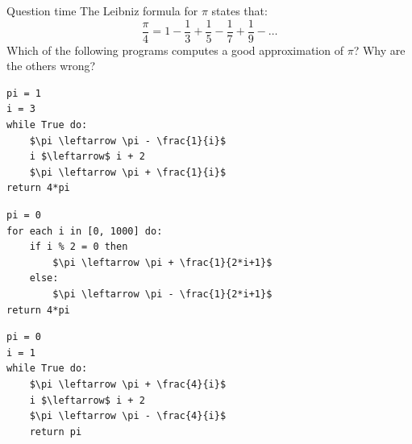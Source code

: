 \documentclass[aspectratio=169,]{beamer}
\begin{document}
\begin{frame}[fragile]{Question time}
    The Leibniz formula for $\pi$ states that:
    \[ \frac{\pi}{4} = 1 - \frac{1}{3} + \frac{1}{5} - \frac{1}{7} + \frac{1}{9} - \ldots \]
    Which of the following programs computes a good approximation of $\pi$?
    Why are the others wrong?

    \begin{minipage}{0.25\textwidth}
        \begin{lstlisting}[style=pseudo]
pi = 1
i = 3
while True do:
    $\pi \leftarrow \pi - \frac{1}{i}$
    i $\leftarrow$ i + 2
    $\pi \leftarrow \pi + \frac{1}{i}$
return 4*pi
        \end{lstlisting}
    \end{minipage}
    \begin{minipage}{0.4\textwidth}
        \begin{lstlisting}[style=pseudo]
pi = 0
for each i in [0, 1000] do:
    if i % 2 = 0 then
        $\pi \leftarrow \pi + \frac{1}{2*i+1}$
    else:
        $\pi \leftarrow \pi - \frac{1}{2*i+1}$
return 4*pi
        \end{lstlisting}
    \end{minipage}
    \begin{minipage}{0.2\textwidth}
        \begin{lstlisting}[style=pseudo]
pi = 0
i = 1
while True do:
    $\pi \leftarrow \pi + \frac{4}{i}$
    i $\leftarrow$ i + 2
    $\pi \leftarrow \pi - \frac{4}{i}$
    return pi
        \end{lstlisting}
    \end{minipage}


\end{frame}
\end{document}
